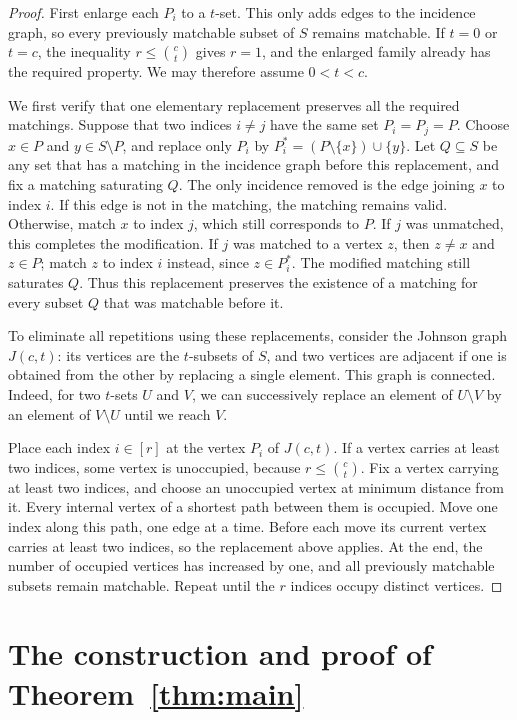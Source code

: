 \documentclass[11pt,a4paper]{article}
\numberwithin{equation}{section}
\theoremstyle{definition}
\theoremstyle{plain}
\begin{document}
\begin{proof}
First enlarge each $P_i$ to a $t$-set. This only adds edges to the
incidence graph, so every previously matchable subset of $S$ remains
matchable. If $t=0$ or $t=c$, the inequality $r\le\binom ct$ gives
$r=1$, and the enlarged family already has the required property.
We may therefore assume $0<t<c$.

We first verify that one elementary replacement preserves all the
required matchings. Suppose that two indices $i\ne j$ have the same
set $P_i=P_j=P$. Choose $x\in P$ and $y\in S\setminus P$, and replace
only $P_i$ by
\(
 P_i^*=(P\setminus\{x\})\cup\{y\}.
\)
Let $Q\subseteq S$ be any set that has a matching in the incidence
graph before this replacement, and fix a matching saturating $Q$.
The only incidence removed is the edge joining $x$ to index $i$.
If this edge is not in the matching, the matching remains valid.
Otherwise, match $x$ to index $j$, which still corresponds to $P$.
If $j$ was unmatched, this completes the modification. If $j$ was
matched to a vertex $z$, then $z\ne x$ and $z\in P$; match $z$ to
index $i$ instead, since $z\in P_i^*$. The modified matching still
saturates $Q$. Thus this replacement preserves the existence of a
matching for every subset $Q$ that was matchable before it.

To eliminate all repetitions using these replacements, consider the
Johnson graph $J(c,t)$: its vertices are the $t$-subsets of $S$, and
two vertices are adjacent if one is obtained from the other by
replacing a single element. This graph is connected. Indeed, for
two $t$-sets $U$ and $V$, we can successively replace an element of
$U\setminus V$ by an element of $V\setminus U$ until we reach $V$.

Place each index $i\in[r]$ at the vertex $P_i$ of $J(c,t)$. If a vertex
carries at least two indices, some vertex is unoccupied, because
$r\le\binom ct$. Fix a vertex carrying at least two indices, and choose
an unoccupied vertex at minimum distance from it. Every internal
vertex of a shortest path between them is occupied. Move one index
along this path, one edge at a time. Before each move its current
vertex carries at least two indices, so the replacement above applies.
At the end, the number of occupied vertices has increased by one,
and all previously matchable subsets remain matchable. Repeat until
the $r$ indices occupy distinct vertices.
\end{proof}

\section{The construction and proof of Theorem~\ref{thm:main}}
\label{sec:proof}
\end{document}
